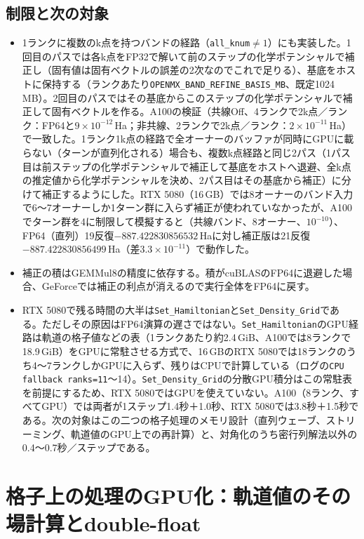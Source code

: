 \documentclass[a4paper,11pt]{ltjsarticle}
\newcommand{\code}[1]{\texttt{#1}}
\newcommand{\E}[1]{\times10^{#1}}
\begin{document}
\subsection{制限と次の対象}
\begin{itemize}
\item 1ランクに複数のk点を持つバンドの経路（\code{all\_knum}$\ne1$）にも実装した。1回目のパスでは各k点をFP32で解いて前のステップの化学ポテンシャルで補正し（固有値は固有ベクトルの誤差の2次なのでこれで足りる）、基底をホストに保持する（ランクあたり\code{OPENMX\_BAND\_REFINE\_BASIS\_MB}、既定1024\,MB）。2回目のパスではその基底からこのステップの化学ポテンシャルで補正して固有ベクトルを作る。A100の検証（共線Off、4ランクで2k点／ランク：FP64と$9\E{-12}$\,Ha；非共線、2ランクで2k点／ランク：$2\E{-11}$\,Ha）で一致した。1ランク1k点の経路で全オーナーのバッファが同時にGPUに載らない（ターンが直列化される）場合も、複数k点経路と同じ2パス（1パス目は前ステップの化学ポテンシャルで補正して基底をホストへ退避、全k点の推定値から化学ポテンシャルを決め、2パス目はその基底から補正）に分けて補正するようにした。RTX 5080（16\,GB）では8オーナーのバンド入力で6〜7オーナーしか1ターン群に入らず補正が使われていなかったが、A100でターン群を4に制限して模擬すると（共線バンド、8オーナー、$10^{-10}$）、FP64（直列）19反復$-887.422830856532$\,Haに対し補正版は21反復$-887.422830856499$\,Ha（差$3.3\E{-11}$）で動作した。
\item 補正の積はGEMMul8の精度に依存する。積がcuBLASのFP64に退避した場合、GeForceでは補正の利点が消えるので実行全体をFP64に戻す。
\item RTX 5080で残る時間の大半は\code{Set\_Hamiltonian}と\code{Set\_Density\_Grid}である。ただしその原因はFP64演算の遅さではない。\code{Set\_Hamiltonian}のGPU経路は軌道の格子値などの表（1ランクあたり約2.4\,GiB、A100では8ランクで18.9\,GiB）をGPUに常駐させる方式で、16\,GBのRTX 5080では18ランクのうち4〜7ランクしかGPUに入らず、残りはCPUで計算している（ログの\code{CPU fallback ranks=11}〜14）。\code{Set\_Density\_Grid}の分散GPU積分はこの常駐表を前提にするため、RTX 5080ではGPUを使えていない。A100（8ランク、すべてGPU）では両者が1ステップ1.4秒＋1.0秒、RTX 5080では3.8秒＋1.5秒である。次の対象はこの二つの格子処理のメモリ設計（直列ウェーブ、ストリーミング、軌道値のGPU上での再計算）と、対角化のうち密行列解法以外の0.4〜0.7秒／ステップである。
\end{itemize}

\section{格子上の処理のGPU化：軌道値のその場計算とdouble-float}\label{sec:grid}
\end{document}
